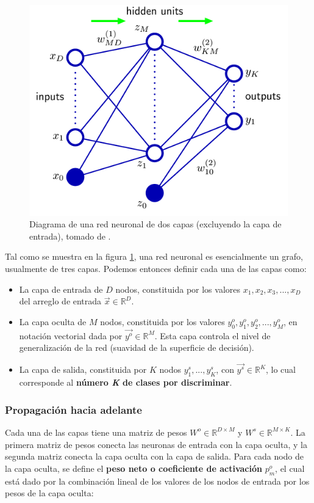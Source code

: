 \documentclass{article}
\begin{document}
\begin{figure}[h!]
    \centering
    \includegraphics[width=0.5\linewidth]{imgs/neural_network_graph.png}
    \caption{Diagrama de una red neuronal de dos capas (excluyendo la capa de entrada), tomado de \cite{bishop2006pattern}.}
    \label{fig:neuronal_network}
\end{figure} 

Tal como se muestra en la figura \ref{fig:neuronal_network}, una red neuronal es esencialmente un grafo, usualmente de tres capas. Podemos entonces definir cada una de las capas como:

\begin{itemize}
    \item La capa de entrada de $D$ nodos, constituida por los valores $x_1, x_2, x_3,..., x_D$ del arreglo de entrada $\vec{x} \in \mathbb{R}^D$.

    \item La capa oculta de $M$ nodos, constituida por los valores $y_0^{o}, y_1^{o}, y_2^{o},..., y_M^{o}$, en notación vectorial dada por $\vec{y^o} \in \mathbb{R}^M$. Esta capa controla el nivel de generalización de la red (suavidad de la superficie de decisión).
    
    \item La capa de salida, constituida por $K$ nodos $y_1^{s},...,y_K^{s}$, con $\vec{y^s} \in \mathbb{R}^K$, lo cual corresponde al \textbf{número \textit{K} de clases por discriminar}. 
\end{itemize}

\subsubsection{Propagación hacia adelante}\label{sec:forward_details}

Cada una de las capas tiene una matriz de pesos $W^o \in \mathbb{R}^{D \times M}$ y $W^s \in \mathbb{R}^{M \times K}$. La primera matriz de pesos conecta las neuronas de entrada con la capa oculta, y la segunda matriz conecta la capa oculta con la capa de salida. Para cada nodo de la capa oculta, se define el \textbf{peso neto o coeficiente de activación} $p_m^o$, el cual está dado por la combinación lineal de los valores de los nodos de entrada por los pesos de la capa oculta:
\end{document}
